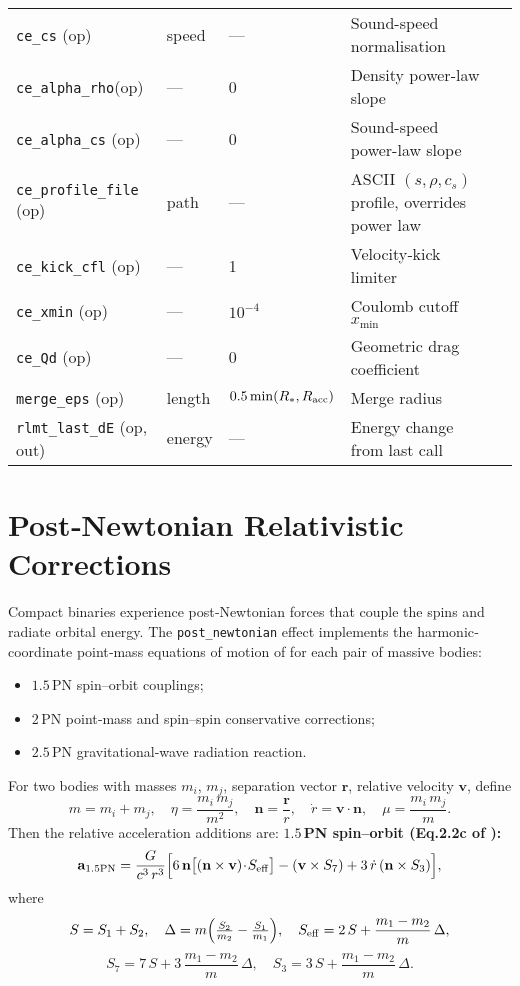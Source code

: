\documentclass[11pt]{article}
\begin{document}
\begin{table}[h]
\begin{tabular}{@{}lllll@{}}
\texttt{ce\_cs}         (op) & speed   & — & Sound-speed normalisation\\
\texttt{ce\_alpha\_rho}(op) & —       & 0 & Density power-law slope\\
\texttt{ce\_alpha\_cs} (op) & —       & 0 & Sound-speed power-law slope\\
\texttt{ce\_profile\_file}  (op) & path & — & ASCII $(s,\rho,c_s)$ profile, overrides power law\\
\texttt{ce\_kick\_cfl}      (op) & — & 1 & Velocity‑kick limiter\\
\texttt{ce\_xmin}           (op) & — & $10^{-4}$ & Coulomb cutoff $x_{\min}$\\
\texttt{ce\_Qd}             (op) & — & 0 & Geometric drag coefficient\\[0.2em]
\texttt{merge\_eps}         (op) & length & $0.5\min(R_*,R_{\rm acc})$ & Merge radius\\
\texttt{rlmt\_last\_dE}    (op, out) & energy & — & Energy change from last call\\
\bottomrule
\end{tabular}
\end{table}

\section{Post‐Newtonian Relativistic Corrections}

Compact binaries experience post‐Newtonian forces that couple the spins
and radiate orbital energy.  The
\texttt{post\_newtonian} effect implements the harmonic‐coordinate
point‐mass equations of motion of \citet{Kidder1995} for each pair of
massive bodies:
\begin{itemize}[nosep,leftmargin=1.8em]
  \item $1.5$\,PN spin–orbit couplings;
  \item $2$\,PN point‐mass and spin–spin conservative corrections;
  \item $2.5$\,PN gravitational‐wave radiation reaction.
\end{itemize}

\medskip
\noindent
For two bodies with masses $m_i$, $m_j$, separation vector $\mathbf{r}$,
relative velocity $\mathbf{v}$, define
\[
  m = m_i + m_j,\quad
  \eta = \frac{m_i\,m_j}{m^2},\quad
  \mathbf{n} = \frac{\mathbf{r}}{r},\quad
  \dot r = \mathbf{v}\cdot\mathbf{n},\quad
  \mu = \frac{m_i\,m_j}{m}.
\]
Then the relative acceleration additions are:
\medskip
\noindent\textbf{$1.5$\,PN spin–orbit (Eq.​2.2c of \citealp{Kidder1995}):}
\[
  \mathbf{a}_{1.5\mathrm{PN}}
  = \frac{G}{c^3\,r^3}
    \Bigl[
      6\,\mathbf{n}\bigl[(\mathbf{n}\times\mathbf{v})\!\cdot\!S_{\rm eff}\bigr]
     -(\mathbf{v}\times S_{7})
     +3\,\dot r\,(\mathbf{n}\times S_{3})
    \Bigr],
\]
where
\[
  S = S_1 + S_2,\quad
  \Delta = m\Bigl(\tfrac{S_2}{m_2}-\tfrac{S_1}{m_1}\Bigr),\quad
  S_{\rm eff} = 2\,S + \frac{m_1-m_2}{m}\,\Delta,
\]
\[
  S_{7} = 7\,S + 3\,\frac{m_1-m_2}{m}\,\Delta,\quad
  S_{3} = 3\,S + \frac{m_1-m_2}{m}\,\Delta.
\]
\end{document}
